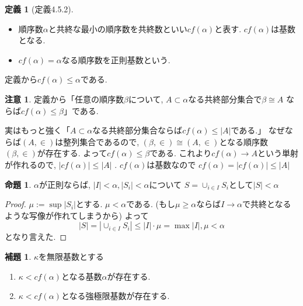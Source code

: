 \documentclass[dvipdfmx,a4paper,11pt]{article}
\theoremstyle{definition}
\newtheorem{lem}[thm]{補題}
\newtheorem{prop}[thm]{命題}
\newtheorem{dfn}[thm]{定義}
\newtheorem{rem}[thm]{注意}
\begin{document}
 \begin{tcolorbox}
 [colback = white, colframe = green!35!black, fonttitle = \bfseries,breakable = true]
\begin{dfn}[定義4.5.2]
\begin{itemize}
\item 順序数$\alpha$と共終な最小の順序数を共終数といい$cf(\alpha)$と表す. 
$cf(\alpha)$は基数となる.  
\item $cf(\alpha) = \alpha$なる順序数を正則基数という. 
\end{itemize}
\end{dfn}
\end{tcolorbox}
定義から$cf(\alpha)\le \alpha$である. 

\begin{rem}
定義から「任意の順序数$\beta$について, $A \subset \alpha$なる共終部分集合で$\beta \cong A$
ならば$cf(\alpha) \le \beta$」である. 

実はもっと強く「$A \subset \alpha$なる共終部分集合ならば$cf(\alpha) \le |A|$である.」
なぜならば$(A, \in)$は整列集合であるので, $(\beta, \in) \cong (A, \in)$となる順序数$(\beta, \in)$が存在する.
よって$cf(\alpha) \le \beta$である.
これより$cf(\alpha)\to A$という単射が作れるので, $|cf(\alpha)| \le |A|$ . $cf(\alpha)$は基数なので
$cf(\alpha) = |cf(\alpha)| \le |A|$
\end{rem}


 \begin{tcolorbox}
 [colback = white, colframe = green!35!black, fonttitle = \bfseries,breakable = true]
\begin{prop}
\label{prop-regular-cardinal}
$\alpha$が正則ならば, $| I | <  \alpha, |S_i| < \alpha$について
$ S = \cup_{i \in I}S_i$として$|S| < \alpha$
\end{prop}
\end{tcolorbox}
\begin{proof}
$\mu := \sup |S_{i}|$とする.
$\mu < \alpha$である.
(もし$\mu \ge \alpha$ならば$I \to \alpha$で共終となるような写像が作れてしまうから)
よって
$$
|S| =
 |\cup_{i \in I}S_i |
 \le 
 | I | \cdot {\mu}
= \max {|I|, \mu}
< \alpha
$$
となり言えた. 
\end{proof}




 \begin{tcolorbox}
 [colback = white, colframe = green!35!black, fonttitle = \bfseries,breakable = true]
\begin{lem}\cite[000E 3.7 Cofinality]{Sta}
\label{lem-cofinal}
$\kappa$を無限基数とする
\begin{enumerate}
\item $\kappa < cf(\alpha)$となる基数$\alpha$が存在する.
\item $\kappa < cf(\alpha)$となる強極限基数が存在する.
\end{enumerate}
\end{lem}
 \end{tcolorbox}
 
\end{document}
